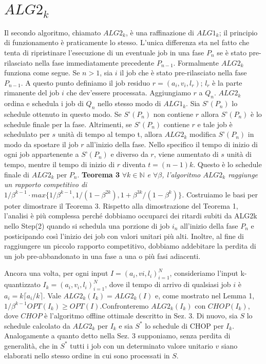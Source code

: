 \documentclass[12pt]{article}
\newcommand*{\N}{\mathbb{N}}
\begin{document}
\section{$ALG2_{k}$}
Il secondo algoritmo, chiamato $ALG2_{k}$, è una raffinazione di $ALG1_{k}$; il principio di funzionamento è praticamente lo stesso. L’unica differenza sta nel fatto che tenta di ripristinare l’esecuzione di un eventuale job in una fase $P_{n}$ se è stato pre-rilasciato nella fase immediatamente precedente $P_{n-1}$. Formalmente $ALG2_{k}$ funziona come segue. Se $n > 1$, sia $i$ il job che è stato pre-rilasciato nella fase $P_{n-1}$. A questo punto definiamo il job residuo $r = (a_{i}, v_{i}, l_{r})$; $l_{r}$ è la parte rimanente del job $i$ che dev’essere processata. Aggiungiamo $r$ a $Q_{n}$. $ALG2_{k}$ ordina e schedula i job di $Q_{n}$ nello stesso modo di $ALG1_{k}$. Sia $S’(P_{n})$ lo schedule ottenuto in questo modo. Se $S’(P_{n})$ non contiene $r$ allora $S’(P_{n})$ è lo schedule finale per la fase. Altrimenti, se $S’(P_{n})$ contiene $r$ e tale job è schedulato per $s$ unità di tempo al tempo t, allora $ALG2_{k}$ modifica $S’(P_{n})$ in modo da spostare il job $r$ all’inizio della fase. Nello specifico il tempo di inizio di ogni job appartenente a $S’(P_{n})$ e diverso da $r$, viene aumentato di $s$ unità di tempo, mentre il tempo di inizio di $r$ diventa $t = (n-1)k$. Questo è lo schedule finale di $ALG2_{k}$ per $P_{n}$.    \newline\newline
\textbf{Teorema 3}
\textit{$\forall k \in \N$ e $\forall \beta$, l'algoritmo $ALG2_{k}$ raggiunge un rapporto competitivo di $1 / \beta^{k - 1} \cdot max \{1 / \beta^{k - 1}, 1 / (1 - \beta^{2k}), 1 + \beta^{3k} / (1 - \beta^{k})\}$.}
\newline\newline
Costruiamo le basi per poter dimostrare il Teorema 3. Rispetto alla dimostrazione del Teorema 1, l'analisi è più complessa perché dobbiamo occuparci dei ritardi subiti da ALG2k nello Step(2) quando si schedula una porzione di job $i_{n}$ all'inizio della fase $P_{n}$ e posticipando così l'inizio dei job con valori unitari più alti. Inoltre, al fine di raggiungere un piccolo rapporto competitivo, dobbiamo addebitare la perdita di un job pre-abbandonato in una fase a una o più fasi adiacenti.

Ancora una volta, per ogni input $I = (a_{i}, v{i}, l_{i})^{N}_{i = 1}$, consideriamo l'input k-quantizzato $I_{k} =(a_{i}, v_{i}, l_{i})^{N}_{i = 1}$, dove il tempo di arrivo di qualsiasi job $i$ è $a_{i} = k \lceil a_{i}/k \rceil$. Vale $ALG2_{k}(I_{k}) = ALG2_{k}(I)$ e, come mostrato nel Lemma 1, $1 / \beta^{k-1} OPT (I_{k}) \geq OPT(I)$.Confronteremo $ALG2_{k}(I_{k})$ con $CHOP(I_{k})$, dove $CHOP$ è l'algoritmo offline ottimale descritto in Sez. 3. Di nuovo, sia $S$ lo schedule calcolato da $ALG2_{k}$ per $I_{k}$ e sia $S^{*}$ lo schedule di CHOP per $I_{k}$. Analogamente a quanto detto nella Sez. 3 supponiamo, senza perdita di generalità, che in $S^{*}$ tutti i job con un determinato valore unitario $v$ siano elaborati nello stesso ordine in cui sono processati in $S$.
\end{document}
